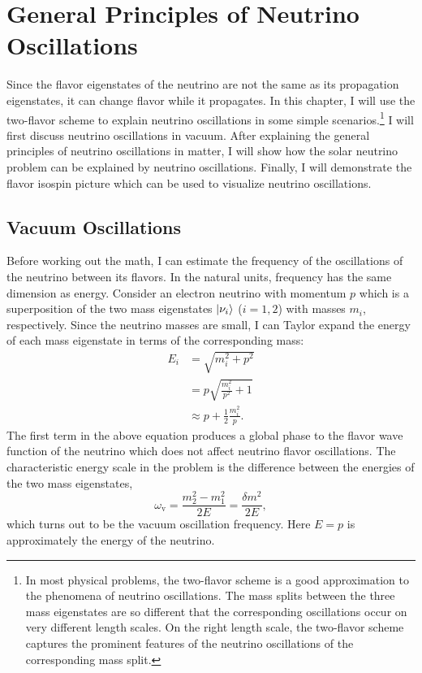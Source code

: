 

\chapter{\label{chap:basics}General Principles of Neutrino Oscillations}

Since the flavor eigenstates of the neutrino are not the same as its propagation eigenstates, it can change flavor while it propagates.
In this chapter, I will use the two-flavor scheme to explain neutrino oscillations in some simple scenarios.\footnote{In most physical problems, the two-flavor scheme is a good approximation to the phenomena of neutrino oscillations. The mass splits between the three mass eigenstates are so different that the corresponding oscillations occur on very different length scales. On the right length scale, the two-flavor scheme captures the prominent features of the neutrino oscillations of the corresponding mass split.}
I will first discuss neutrino oscillations in vacuum. After explaining the general principles of neutrino oscillations in matter, I will show how the solar neutrino problem can be explained by neutrino oscillations. Finally, I will demonstrate the flavor isospin picture which can be used to visualize neutrino oscillations.


\section{\label{chap:basics-sec:vacuum-oscillations}Vacuum Oscillations}

Before working out the math, I can estimate the frequency of the oscillations of the neutrino between its flavors. In the natural units, frequency has the same dimension as energy. 
Consider an electron neutrino with momentum $p$ which is a superposition of the two mass eigenstates $\left| \nu_i\right\rangle$ ($i=1,2$) with masses $m_i$, respectively. Since the neutrino masses are small, I can Taylor expand the energy of each mass eigenstate in terms of the corresponding mass:
\begin{align}
E_i & = \sqrt{m_i^2 + p^2 } \nonumber\\
& = p \sqrt{\frac{m_i^2}{p^2} + 1} \nonumber\\
& \approx p + \frac{1}{2} \frac{m_i^2}{p}.
\label{chap:basics-section:neutrinos-eqn:energy-taylor}
\end{align}
The first term in the above equation produces a global phase to the flavor wave function of the neutrino which does not affect neutrino flavor oscillations. The characteristic energy scale in the problem is the difference between the energies of the two mass eigenstates,
\begin{equation}
    \omega_{\mathrm v} =  \frac{m_2^2-m_1^2}{2E} = \frac{\delta m^2}{2E},
    \label{chap:basics-section:neutrinos-eqn:qualitative-method-frequency}
\end{equation}
which turns out to be the vacuum oscillation frequency. Here $E=p$ is approximately the energy of the neutrino.

